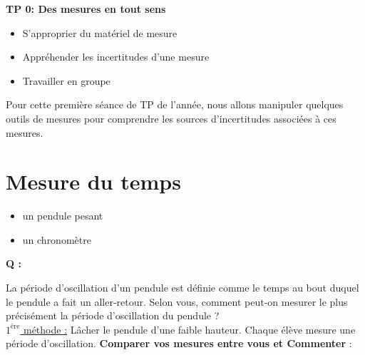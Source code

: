 
\renewcommand{\thesubsection}{\textcolor{red}{\Roman{section}.\arabic{subsection}}}
\renewcommand{\thesubsubsection}{\textcolor{red}{\Roman{section}.\arabic{subsection}.\alph{subsubsection}}}

\setcounter{section}{0}
\sndEnTeteTPO

\begin{center}
\begin{mdframed}[style=titr, leftmargin=60pt, rightmargin=60pt, innertopmargin=7pt, innerbottommargin=7pt, innerrightmargin=8pt, innerleftmargin=8pt]

\begin{center}
\large{\textbf{TP 0: Des mesures en tout sens}}
\end{center}

\end{mdframed}
\end{center}



\begin{tcolorbox}[colback=blue!5!white,colframe=blue!75!black,title=Objectifs de la séance :]
\begin{itemize}
    \item S'approprier du matériel de mesure
    \item Appréhender les incertitudes d'une mesure
    \item Travailler en groupe
\end{itemize}
\end{tcolorbox}

Pour cette première séance de TP de l'année, nous allons manipuler quelques outils de mesures pour comprendre les sources d'incertitudes associées à ces mesures.

\section{Mesure du temps}
\begin{mdframed}[style=autreexo]
\textbf{}
\begin{itemize}
    \item un pendule pesant
    \item un chronomètre
\end{itemize}
\end{mdframed}
\begin{Large}{\textbf{Q :}} \end{Large} La période d'oscillation d'un pendule est définie comme le temps au bout duquel le pendule a fait un aller-retour. Selon vous, comment peut-on mesurer le plus précisément la période d'oscillation du pendule ? \\
\newline
\newline
\underline{$1^{\text{ère}}$ méthode :} Lâcher le pendule d'une faible hauteur. Chaque élève mesure une période d'oscillation. \textbf{Comparer vos mesures entre vous et Commenter }:
\vspace{8cm}

